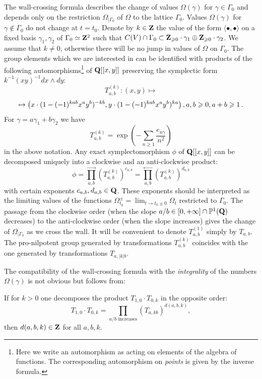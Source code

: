 \documentclass[12pt]{article}
\begin{document}
The wall-crossing formula describes  the change of values $\Omega(\gamma)$ for $\gamma \in \Gamma_0$ and depends only on the restriction
 $\Omega_{|\Gamma_0}$ of $\Omega$ to the  lattice $\Gamma_0$. Values $\Omega(\gamma)$ for $\gamma\notin \Gamma_0$ 
do not change at $t=t_0$. 
Denote by $k\in {\bf Z}$ the value of the form $\langle\bullet,\bullet\rangle$ on a fixed basis $\gamma_1,\gamma_2$ of $\Gamma_0\simeq {\bf Z}^2$ such that $C(V)\cap \Gamma_0\subset {\bf Z}_{\geqslant 0}\cdot\gamma_1\oplus {\bf Z}_{\geqslant 0}\cdot\gamma_2$. We assume that $k\ne 0$, otherwise there will be no jump in values of $\Omega$ on $\Gamma_0$.
The group  elements which we are interested in
can be identified with products of the following 
automorphisms\footnote{Here we write an automorphism as acting
on elements of the algebra of functions. The corresponding automorphism on {\emph{points}} is given by the inverse formula.} of ${\bf Q}[[x,y]]$ preserving the symplectic form $k^{-1}(xy)^{-1} dx\wedge dy$:
$$
T_{a,b}^{(k)}:(x,y)\mapsto $$
$$\mapsto \left( x\cdot (1-(-1)^{kab} x^a y^b)^{-kb}, y\cdot(1-(-1)^{kab} x^a y^b)^{ka}\right),\medskip a,b\geqslant 0, a+b\geqslant 1\,.
$$
For $\gamma=a\gamma_1+b\gamma_2$ we have
$$T_{a,b}^{(k)}=\exp\left(-\sum_{n\geqslant 1}\frac{e_{n\gamma}}{n^2}\right)$$
in the above notation.
Any exact symplectomorphism $\phi$ of ${\bf Q}[[x,y]]$ can be decomposed uniquely into a clockwise and an anti-clockwise product:
$$\phi=\prod_{a,b}^{\longrightarrow} \left(T_{a,b}^{(k)}\right)^{c_{a,b}}=\prod_{a,b}^{\longleftarrow} \left(T_{a,b}^{(k)}\right)^{{d}_{a,b}}$$
with certain exponents $c_{a,b},d_{a,b}\in {\bf Q}$. These exponents should be interpreted as the 
limiting values
of the functions $\Omega_{t_0}^{\pm}=\lim_{t\to t_0\pm 0}\Omega_t$ restricted to $\Gamma_0$.
The passage from the clockwise order (when the slope $a/b \in [0,+\infty]\cap {\mathbb P}^1({\bf Q})$ decreases) to the anti-clockwise order (when the slope increases) gives the change of $\Omega_{|\Gamma_0}$ as we cross the wall.
It will be convenient to denote $T_{a,b}^{(1)}$ simply by $T_{a,b}$. The pro-nilpotent group generated by 
 transformations $T_{a,b}^{(k)}$ coincides with the one generated by transformations $T_{a,|k|b}$.

The compatibility of the wall-crossing formula with the {\it integrality} of the numbers $\Omega(\gamma)$ is not obvious but follows from:

\begin{conj}
If for $k>0$ one decomposes the product $T_{1,0}\cdot T_{0,k}$ in the opposite order:
$$T_{1,0}\cdot T_{0,k}= \prod_{a/b \text{ increases}}  (T_{a,kb})^{d(a,b,k)},$$
then $d(a,b,k)\in {\bf Z}$ for all $a,b,k$.
\end{conj}
\end{document}
